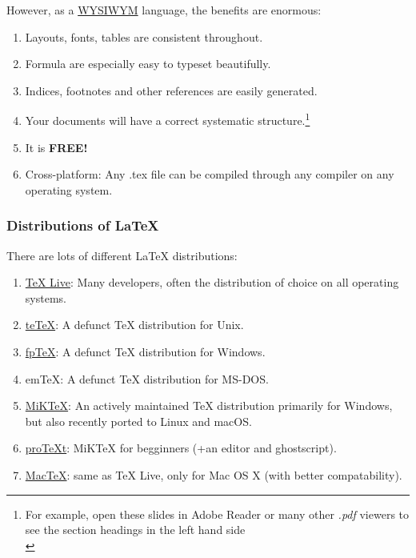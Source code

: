 \documentclass[a4paper, 12pt]{article}
\begin{document}
\noindent
\smiley{} However, as a \href{http://en.wikipedia.org/wiki/WYSIWYM}{\color{blue}WYSIWYM} language, the benefits are enormous:

\begin{enumerate}
\item Layouts, fonts, tables are consistent throughout.
\item Formula are especially easy to typeset beautifully.
\item Indices, footnotes and other references are easily generated.
\item Your documents will have a correct systematic structure.\footnote{For example, open these slides in Adobe Reader or many other \emph{.pdf} viewers to see the section headings in the left hand side\\}	%
\item It is \textbf{FREE!} %
\item Cross-platform: Any .tex file can be compiled through any compiler on any operating system.
\end{enumerate}

\subsubsection{Distributions of \LaTeX{}}

There are lots of different \LaTeX{} distributions:

\begin{enumerate}
\item \href{http://tug.org/texlive}{TeX Live}: Many developers, often the distribution of choice on all operating systems.
\item \href{https://www.tug.org/tetex/}{teTeX}: A defunct \TeX{} distribution for Unix.
\item \href{https://ctan.org/pkg/fptex}{fpTeX}: A defunct \TeX{} distribution for Windows.
\item emTeX: A defunct TeX distribution for MS-DOS.
\item \href{http://miktex.org}{MiKTeX}: An actively maintained TeX distribution primarily for Windows, but also recently ported to Linux and macOS.
\item \href{https://www.tug.org/protext/}{proTeXt}: MiKTeX for begginners (+an editor and ghostscript).
\item \href{http://tug.org/mactex}{MacTeX}: same as TeX Live, only for Mac OS X (with better compatability).
\end{enumerate}
\end{document}
